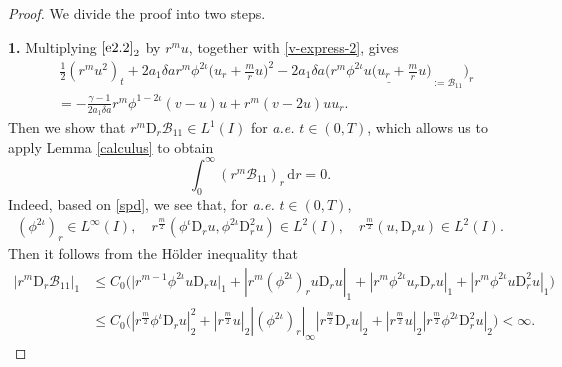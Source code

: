 \documentclass[11pt,reqno]{amsart}
\numberwithin{rk}{section}
\numberwithin{prop}{section}
\numberwithin{mydef}{section}
\numberwithin{lem}{section}
\numberwithin{equation}{section}
\numberwithin{thm}{section}
\begin{document}
\begin{proof} We divide the proof into two steps.

\smallskip
\textbf{1.} Multiplying $\eqref{e2.2}_2$ by $r^m u$, together with \eqref{v-express-2}, gives
\begin{equation}\label{eq:B7-pre}
\begin{aligned}
&\,\frac{1}{2}(r^m u^2)_t+2a_1\delta a r^m\phi^{2\iota} \big(u_r+\frac{m}{r}u\big)^2-2a_1\delta a\Big(r^m \underline{\phi^{2\iota}u\big(u_r+\frac{m}{r}u\big)}_{:=\mathcal{B}_{11}}\Big)_r \\
&= -\frac{\gamma-1}{2a_1\delta a }r^m\phi^{1-2\iota}(v-u)u+ r^m(v-2u)uu_r.
\end{aligned}
\end{equation}
Then we show that $r^m \mathrm{D}_r \mathcal{B}_{11} \in L^1(I)$ for {\it a.e.} $t\in (0,T)$, which allows us to apply Lemma \ref{calculus} to obtain
\begin{equation}\label{eq:B7}
\int_0^\infty (r^m\mathcal{B}_{11})_r\,\mathrm{d}r=0.
\end{equation}
Indeed, based on \eqref{spd}, we see that, for \textit{a.e.} $t\in (0,T)$, 
\begin{equation*}
\begin{aligned}
(\phi^{2\iota})_r \in L^\infty(I),\quad r^\frac{m}{2}(\phi^\iota \mathrm{D}_r u,\phi^{2\iota} \mathrm{D}_r^2 u)\in L^2(I),\quad r^\frac{m}{2} (u,\mathrm{D}_r u)\in L^2(I).
\end{aligned}
\end{equation*}
Then it follows from the H\"older inequality that 
\begin{equation*}
\begin{aligned}
|r^m \mathrm{D}_r \mathcal{B}_{11}|_1&\leq C_0\big(\big|r^{m-1}\phi^{2\iota}u\mathrm{D}_r u\big|_1+ |r^m(\phi^{2\iota})_ru\mathrm{D}_r u|_1 + |r^{m}\phi^{2\iota}u_r\mathrm{D}_r u|_1+ |r^{m}\phi^{2\iota}u\mathrm{D}_r^2 u|_1\big)\\
&\leq C_0\big(|r^\frac{m}{2}\phi^\iota\mathrm{D}_r u |_2^2+ |r^\frac{m}{2}u|_2|(\phi^{2\iota})_r|_\infty |r^\frac{m}{2}\mathrm{D}_r u|_2+ |r^\frac{m}{2}u|_2 |r^\frac{m}{2}\phi^{2\iota}\mathrm{D}_r^2 u|_2\big)<\infty.    
\end{aligned}
\end{equation*}    


\end{proof}
\end{document}
